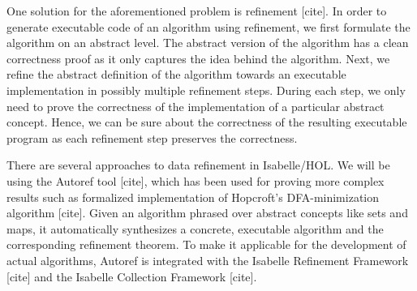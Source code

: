 \documentclass{llncs}
\begin{document}
One solution for the aforementioned problem is refinement [cite]. In order to generate executable code of an algorithm using refinement, we first formulate the algorithm on an abstract level. The abstract version of the algorithm has a clean correctness proof as it only captures the idea behind the algorithm. Next, we refine the abstract definition of the algorithm towards an executable implementation in possibly multiple refinement steps. During each step, we only need to prove the correctness of the implementation of a particular abstract concept. Hence, we can be sure about the correctness of the resulting executable program as each refinement step preserves the correctness.

There are several approaches to data refinement in Isabelle/HOL. We will be using the Autoref tool [cite], which has been used for proving more complex results such as formalized implementation of Hopcroft’s DFA-minimization algorithm [cite]. Given an algorithm phrased over abstract concepts like sets and maps, it automatically synthesizes a concrete, executable algorithm and the corresponding refinement theorem. To make it applicable for the development of actual algorithms, Autoref is integrated with the Isabelle Refinement Framework [cite] and the Isabelle Collection Framework [cite].
\end{document}
